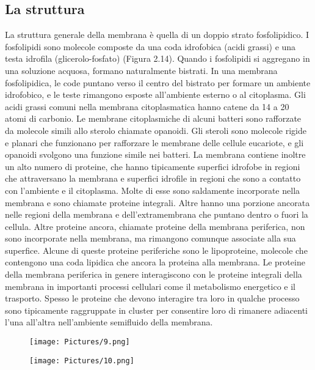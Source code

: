 \subsection{La struttura}
La struttura generale della membrana è quella di un doppio strato fosfolipidico. I fosfolipidi sono molecole composte da una coda idrofobica (acidi grassi) e una testa idrofila (glicerolo-fosfato) (Figura 2.14).
Quando i fosfolipidi si aggregano in una soluzione acquosa, formano naturalmente bistrati. In una membrana 
fosfolipidica, le code puntano verso il centro del bistrato per formare un ambiente idrofobico, e le teste rimangono esposte 
all'ambiente esterno o al citoplasma. Gli acidi grassi comuni nella membrana citoplasmatica hanno catene da  14 a 20 atomi di carbonio.
Le membrane citoplasmiche di alcuni batteri sono rafforzate da molecole simili allo sterolo chiamate opanoidi. Gli steroli sono molecole rigide e planari 
che funzionano per rafforzare le membrane delle cellule eucariote, e gli opanoidi svolgono una funzione simile nei batteri.
La membrana contiene inoltre un alto numero di proteine, che hanno tipicamente superfici idrofobe in regioni che attraversano la membrana e superfici 
idrofile in regioni che sono a contatto con l'ambiente e il citoplasma. Molte di esse sono saldamente incorporate nella membrana e sono chiamate proteine 
integrali. Altre hanno una porzione ancorata nelle regioni della membrana e dell'extramembrana che puntano dentro o fuori la cellula. Altre proteine ancora, 
chiamate proteine della membrana periferica, non sono incorporate nella membrana, ma rimangono comunque associate alla sua superfice. Alcune di queste 
proteine periferiche sono le lipoproteine, molecole che contengono una coda lipidica che ancora la proteina alla membrana. Le proteine della membrana 
periferica in genere interagiscono con le proteine integrali della membrana in importanti processi cellulari come il metabolismo energetico e il trasporto. 
Spesso le proteine che devono interagire tra loro in qualche processo sono tipicamente raggruppate in cluster per consentire loro di rimanere adiacenti 
l'una all'altra nell'ambiente semifluido della  membrana.
\begin{multicols}{2}
\begin{figure}[H]
	\texttt{[image: Pictures/9.png]}
\end{figure}
\begin{figure}[H]
	\texttt{[image: Pictures/10.png]}
\end{figure}
\end{multicols}
